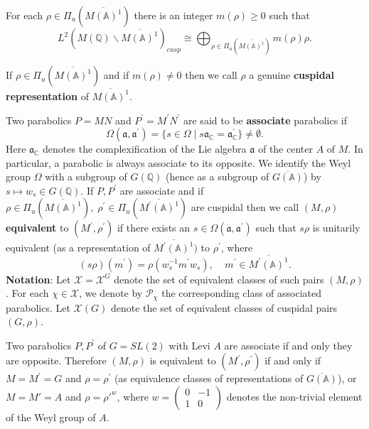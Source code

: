 \begin{proposition}\label{prop:5.3}
For each $\rho \in \Pi _u(\overline{M({\mathbb{A}})^1})$
there is an integer $m(\rho )\geq 0$ such that 
\[
L^2(M({{\mathbb{Q}}})\backslash \overline{M({\mathbb{A}})^1})_{cusp}\cong
\bigoplus_{\rho \in \Pi _u(\overline{M({\mathbb{A}})^1})}m(\rho )\rho .
\]
\end{proposition}

If
$\rho \in \Pi _u(\overline{M({\mathbb{A}})^1})$ and if $m(\rho )\neq 0$
then we call $\rho $ a genuine {\bf cuspidal
representation} of $\overline{M({\mathbb{A}})^1}$.

Two parabolics $P=MN$ and $P^{\prime }=M^{\prime }N^{\prime }$ are said to
be {\bf associate} parabolics if 
\[
\Omega ({\mathfrak{a}},{\mathfrak{a}}^{\prime })
=\{s\in \Omega \;|\;s{\mathfrak{a}}_{{\mathbb C}}
={\mathfrak{a}}_{{\mathbb C}}^{\prime }\}\neq \emptyset . 
\]
Here ${\mathfrak{a}}_{\mathbb{C}}$ denotes the
complexification of the Lie algebra
${\mathfrak{a}}$ of the center $A$ of $M$. In particular, a parabolic is
always associate to its opposite.
We identify the Weyl group $\Omega$ with a
subgroup of $G({\mathbb{Q}})$ (hence as a subgroup of
$\overline{G({\mathbb{A}})}$) by $s\longmapsto w_s\in G({\mathbb{Q}})$.
If $P,P^{\prime }$ are associate and if 
$\rho \in \Pi _u(\overline{M({\mathbb{A}})^1}),
\;\rho ^{\prime }\in \Pi _u(\overline{M^{\prime }({\mathbb{A}})^1})$
are cuspidal then we call $(M,\rho )$ {\bf equivalent} to
$(M^{\prime },\rho ^{\prime })$ if there exists an
$s\in \Omega ({\mathfrak{a}}, {\mathfrak{a}}^{\prime })$ such that
$s\rho $ is unitarily equivalent (as a
representation of $\overline{M^{\prime }({\mathbb{A}})^1})$
to $\rho ^{\prime }$, where 
\[
(s\rho )(m^{\prime })=\rho (w_s^{-1}m^{\prime }w_s),
\;\;\;\;m^{\prime }\in \overline{M^{\prime }({{\mathbb{A}}})^1}. 
\]
{\bf Notation}:
Let ${\mathcal{X}}={\mathcal{X}}^G$ denote the set of equivalent classes of such
pairs $(M,\rho )$.
For each $\chi \in {\mathcal X}$, we denote by
${\mathcal P}_\chi $ the corresponding class of associated parabolics.
Let ${\mathcal{X}}(G)$ denote the set of equivalent classes of
cuspidal pairs $(G,\rho )$.

\begin{example}\label{ex:5.4}
Two parabolics $P,P^{\prime }$ of $G=SL(2)$ with Levi $A$
are associate if and only they are opposite.
Therefore $(M,\rho )$ is equivalent to $(M^{\prime },\rho ^{\prime })$
if and only if $M=M^{\prime }=G$ and $\rho =\rho ^{\prime }$
(as equivalence classes of representations of
$\overline{G({\mathbb{A}})}$),
or $M=M'=A$ and $\rho ={\rho'}^w$, where 
$w=
\left(
\begin{array}{cc}
0 &-1\\
1&0
\end{array}
\right)$
denotes the non-trivial element of the Weyl group of $A$.
\end{example}

